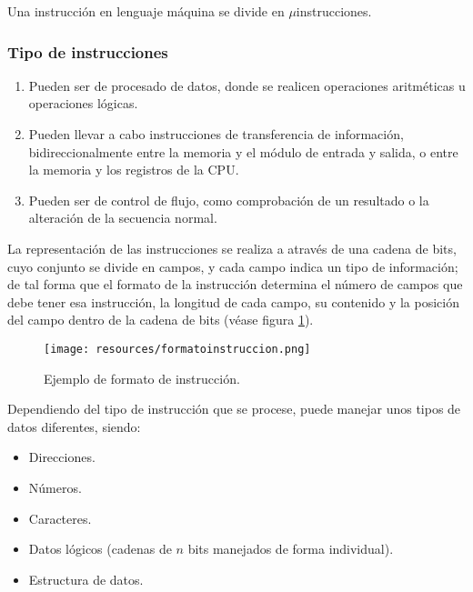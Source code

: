 \documentclass[a4paper, 11pt, titlepage]{article}
\begin{document}
            Una instrucción en lenguaje máquina se divide en $\mu$instrucciones.

        \subsubsection{Tipo de instrucciones}

            \begin{enumerate}
                \item Pueden ser de procesado de datos, donde se realicen operaciones aritméticas u operaciones 
                lógicas.
                \item Pueden llevar a cabo instrucciones de transferencia de información, bidireccionalmente 
                entre la memoria y el módulo de entrada y salida, o entre la memoria y los registros de la CPU.
                \item Pueden ser de control de flujo, como comprobación de un resultado o la alteración de la secuencia 
                normal.
            \end{enumerate}

            La representación de las instrucciones se realiza a através de una cadena de bits, cuyo conjunto se 
            divide en campos, y cada campo indica un tipo de información; de tal forma que el formato de la 
            instrucción determina el número de campos que debe tener esa instrucción, la longitud de cada campo, 
            su contenido y la posición del campo dentro de la cadena de bits (véase figura \ref{formatoinstruccion}).

            \begin{figure}[htp]
                \centering
                \texttt{[image: resources/formatoinstruccion.png]}
                \caption{Ejemplo de formato de instrucción.}
                \label{formatoinstruccion}
            \end{figure}

            Dependiendo del tipo de instrucción que se procese, puede manejar unos tipos de datos diferentes, siendo:

            \begin{itemize}
                \item Direcciones.
                \item Números.
                \item Caracteres.
                \item Datos lógicos (cadenas de $n$ bits manejados de forma individual).
                \item Estructura de datos.
            \end{itemize}
\end{document}
